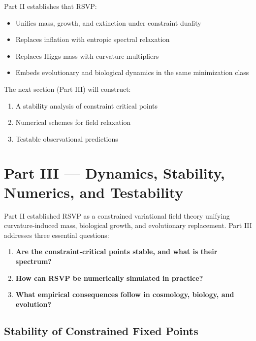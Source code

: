 \documentclass[11pt,a4paper]{article}
\begin{document}
Part II establishes that RSVP:

\begin{itemize}
    \item Unifies mass, growth, and extinction under constraint duality
    \item Replaces inflation with entropic spectral relaxation
    \item Replaces Higgs mass with curvature multipliers
    \item Embeds evolutionary and biological dynamics in the same minimization class
\end{itemize}

The next section (Part III) will construct:

\begin{enumerate}
    \item A stability analysis of constraint critical points
    \item Numerical schemes for field relaxation
    \item Testable observational predictions
\end{enumerate}

\clearpage
\section{Part III — Dynamics, Stability, Numerics, and Testability}

Part II established RSVP as a constrained variational field theory unifying curvature-induced mass, biological growth, and evolutionary replacement. Part III addresses three essential questions:

\begin{enumerate}
    \item \textbf{Are the constraint-critical points stable, and what is their spectrum?}
    \item \textbf{How can RSVP be numerically simulated in practice?}
    \item \textbf{What empirical consequences follow in cosmology, biology, and evolution?}
\end{enumerate}

\subsection{Stability of Constrained Fixed Points}
\end{document}
